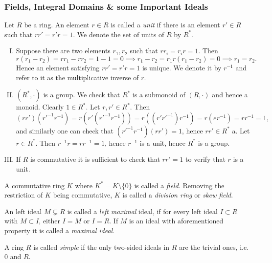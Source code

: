 \subsubsection{Fields, Integral Domains \& some Important Ideals}
\begin{definition}
    Let $R$ be a ring. An element $r\in R$ is called a \textit{unit} if there is an element $r'\in R$ such that $rr'=r'r = 1$. We denote the set of units of $R$ by $R^\ast$.
\end{definition}
\begin{remark}
    \begin{enumerate}[I.]
        \item Suppose there are two elements $r_1,r_2$ such that $rr_i = r_ir = 1$. Then 
        $$r(r_1-r_2) = rr_1-rr_2=1-1=0 \implies r_1-r_2=r_1r(r_1-r_2)=0 \implies r_1 =r_2.$$
        Hence an element satisfying $rr'=r'r=1$ is unique. We denote it by $r^{-1}$ and refer to it as the multiplicative inverse of $r$. 
        \item $(R^\ast, \cdot)$ is a group. We check that $R^\ast$ is a submonoid of $(R,\cdot)$ and hence a monoid. Clearly $1 \in R^\ast$. Let $r,r' \in R^\ast$. Then $$\left(rr'\right)\left(r'^{-1}r^{-1}\right)=r\left(r'\left(r'^{-1}r^{-1}\right)\right)=r\left(\left(r'r'^{-1}\right)r^{-1}\right)=r\left(er^{-1}\right) = rr^{-1} = 1,$$
        and similarly one can check that $\left(r'^{-1}r^{-1}\right)(rr') = 1$, hence $rr'\in R^\ast$ a. Let $r\in R^\ast$. Then $r^{-1}r=rr^{-1}=1$, hence $r^{-1}$ is a unit, hence $R^\ast$ is a group.
        \item If $R$ is commutative it is sufficient to check that $rr'=1$ to verify that $r$ is a unit.
    \end{enumerate}   
\end{remark}
\begin{definition}
    A commutative ring $K$ where $K^\ast = K\setminus \{0\}$ is called a \textit{field}. Removing the restriction of $K$ being commutative, $K$ is called a \textit{division ring} or \textit{skew field}.
\end{definition}
\begin{definition}
    An left ideal $M\subsetneq R$ is called a \textit{left maximal} ideal, if for every left ideal $I\subset R$ with $M\subset I$, either $I=M$ or $I=R$. If $M$ is an ideal with aforementioned property it is called a \textit{maximal ideal}.  
\end{definition}
\begin{definition}
    A ring $R$ is called \textit{simple} if the only two-sided ideals in $R$ are the trivial ones, i.e. $0$ and $R$.
\end{definition}
